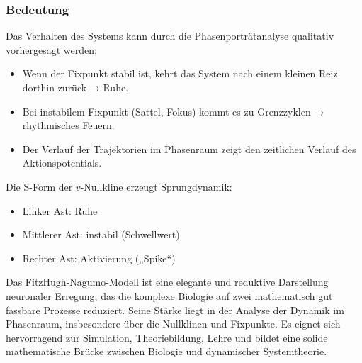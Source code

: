 \subsubsection{Bedeutung}
Das Verhalten des Systems kann durch die Phasenporträtanalyse qualitativ vorhergesagt werden:
\begin{itemize}
	\item Wenn der Fixpunkt stabil ist, kehrt das System nach einem kleinen Reiz dorthin zurück → Ruhe.
	\item Bei instabilem Fixpunkt (Sattel, Fokus) kommt es zu Grenzzyklen → rhythmisches Feuern.
	\item Der Verlauf der Trajektorien im Phasenraum zeigt den zeitlichen Verlauf des Aktionspotentials.
\end{itemize}
Die S-Form der $v$-Nullkline erzeugt Sprungdynamik:
\begin{itemize}
	\item Linker Ast: Ruhe
	\item Mittlerer Ast: instabil (Schwellwert)
	\item Rechter Ast: Aktivierung („Spike“)
\end{itemize}
Das FitzHugh-Nagumo-Modell ist eine elegante und reduktive Darstellung neuronaler Erregung, das die komplexe Biologie auf zwei mathematisch gut fassbare Prozesse reduziert. Seine Stärke liegt in der Analyse der Dynamik im Phasenraum, insbesondere über die Nullklinen und Fixpunkte. Es eignet sich hervorragend zur Simulation, Theoriebildung, Lehre und bildet eine solide mathematische Brücke zwischen Biologie und dynamischer Systemtheorie.

